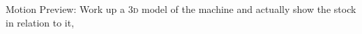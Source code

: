 \documentclass{ltxdoc}
\begin{document}
Motion Preview: Work up a \textsc{3d} model of the machine and actually show the stock in relation to it, 

\end{document}
